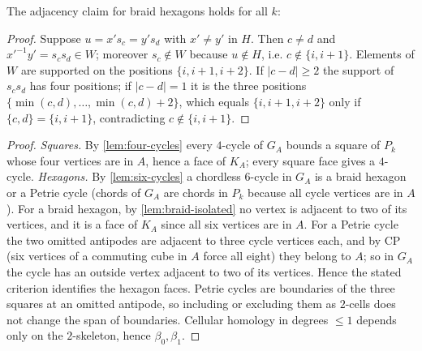 The adjacency claim for braid hexagons holds for all $k$:
\begin{proof}
Suppose $u=x's_c=y's_d$ with $x'\ne y'$ in $H$. Then $c\ne d$ and $x'^{-1}y'=s_cs_d\in W$; moreover $s_c\notin W$ because $u\notin H$, i.e. $c\notin\{i,i+1\}$. Elements of $W$ are supported on the positions $\{i,i{+}1,i{+}2\}$. If $|c-d|\ge2$ the support of $s_cs_d$ has four positions; if $|c-d|=1$ it is the three positions $\{\min(c,d),\dots,\min(c,d)+2\}$, which equals $\{i,i+1,i+2\}$ only if $\{c,d\}=\{i,i+1\}$, contradicting $c\notin\{i,i+1\}$.
\end{proof}
\begin{proof}
\emph{Squares.} By \cref{lem:four-cycles} every $4$-cycle of $G_A$ bounds a square of $P_k$ whose four vertices are in $A$, hence a face of $K_A$; every square face gives a $4$-cycle. \emph{Hexagons.} By \cref{lem:six-cycles} a chordless $6$-cycle in $G_A$ is a braid hexagon or a Petrie cycle (chords of $G_A$ are chords in $P_k$ because all cycle vertices are in $A$). For a braid hexagon, by \cref{lem:braid-isolated} no vertex is adjacent to two of its vertices, and it is a face of $K_A$ since all six vertices are in $A$. For a Petrie cycle the two omitted antipodes are adjacent to three cycle vertices each, and by CP (six vertices of a commuting cube in $A$ force all eight) they belong to $A$; so in $G_A$ the cycle has an outside vertex adjacent to two of its vertices. Hence the stated criterion identifies the hexagon faces. Petrie cycles are boundaries of the three squares at an omitted antipode, so including or excluding them as $2$-cells does not change the span of boundaries. Cellular homology in degrees $\le1$ depends only on the $2$-skeleton, hence $\beta_0,\beta_1$.
\end{proof}
